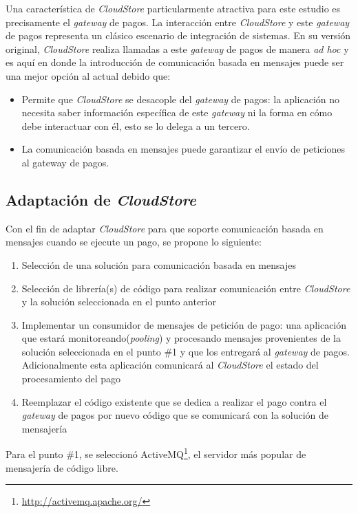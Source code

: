 \documentclass[conference]{IEEEtran}
\begin{document}
Una característica de \emph{CloudStore} particularmente atractiva para este estudio es precisamente el \emph{gateway} de pagos. La interacción entre \emph{CloudStore} y este \emph{gateway} de pagos representa un clásico escenario de integración de sistemas. En su versión original, \emph{CloudStore} realiza llamadas a este \emph{gateway} de pagos de manera \emph{ad hoc} y es aquí en donde la introducción de comunicación basada en mensajes puede ser una mejor opción al actual debido que:
\begin{itemize}
    \item Permite que \emph{CloudStore} se desacople del \emph{gateway} de pagos: la aplicación no necesita saber información específica de este \emph{gateway} ni la forma en cómo debe interactuar con él, esto se lo delega a un tercero. 
    \item La comunicación basada en mensajes puede garantizar el envío de peticiones al gateway de pagos.
\end{itemize}

\subsection{Adaptación de \emph{CloudStore}}
Con el fin de adaptar \emph{CloudStore} para que soporte comunicación basada en mensajes cuando se ejecute un pago, se propone lo siguiente:
\begin{enumerate}
    \item Selección de una solución para comunicación basada en mensajes
    \item Selección de librería(s) de código para realizar comunicación entre \emph{CloudStore} y la solución seleccionada en el punto anterior
    \item Implementar un consumidor de mensajes de petición de pago: una aplicación que estará monitoreando(\emph{pooling}) y procesando mensajes provenientes de la solución seleccionada en el punto \#1 y que los entregará al \emph{gateway} de pagos. Adicionalmente esta aplicación comunicará al \emph{CloudStore} el estado del procesamiento del pago
    \item Reemplazar el código existente que se dedica a realizar el pago contra el \emph{gateway} de pagos por nuevo código que se comunicará con la solución de mensajería
\end{enumerate}

Para el punto \#1, se seleccionó ActiveMQ\footnote{\url{http://activemq.apache.org/}}, el servidor más popular de mensajería de código libre.
 
\end{document}

